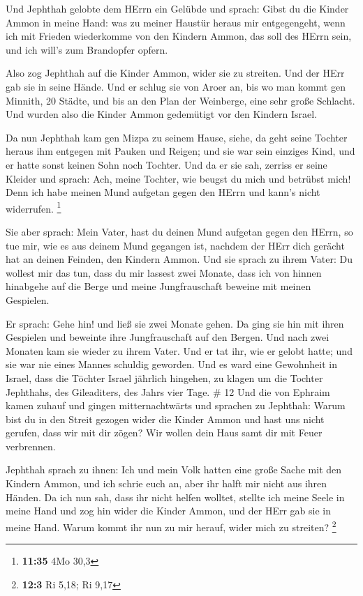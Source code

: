  Und Jephthah gelobte dem HErrn ein Gelübde und sprach:
Gibst du die Kinder Ammon in meine Hand:  was zu meiner
Haustür heraus mir entgegengeht, wenn ich mit Frieden wiederkomme von
den Kindern Ammon, das soll des HErrn sein, und ich will's zum
Brandopfer opfern.

 Also zog Jephthah auf die Kinder Ammon, wider sie zu
streiten. Und der HErr gab sie in seine Hände.  Und er
schlug sie von Aroer an, bis wo man kommt gen Minnith, 20 Städte, und
bis an den Plan der Weinberge, eine sehr große Schlacht. Und wurden also
die Kinder Ammon gedemütigt vor den Kindern Israel.

 Da nun Jephthah kam gen Mizpa zu seinem Hause, siehe, da
geht seine Tochter heraus ihm entgegen mit Pauken und Reigen; und sie
war sein einziges Kind, und er hatte sonst keinen Sohn noch Tochter.
 Und da er sie sah, zerriss er seine Kleider und sprach:
Ach, meine Tochter, wie beugst du mich und betrübst mich! Denn ich habe
meinen Mund aufgetan gegen den HErrn und kann's nicht widerrufen.
\footnote{\textbf{11:35} 4Mo 30,3}

 Sie aber sprach: Mein Vater, hast du deinen Mund aufgetan
gegen den HErrn, so tue mir, wie es aus deinem Mund gegangen ist,
nachdem der HErr dich gerächt hat an deinen Feinden, den Kindern Ammon.
 Und sie sprach zu ihrem Vater: Du wollest mir das tun,
dass du mir lassest zwei Monate, dass ich von hinnen hinabgehe auf die
Berge und meine Jungfrauschaft beweine mit meinen Gespielen.

 Er sprach: Gehe hin! und ließ sie zwei Monate gehen. Da
ging sie hin mit ihren Gespielen und beweinte ihre Jungfrauschaft auf
den Bergen.  Und nach zwei Monaten kam sie wieder zu ihrem
Vater. Und er tat ihr, wie er gelobt hatte; und sie war nie eines Mannes
schuldig geworden. Und es ward eine Gewohnheit in Israel, 
dass die Töchter Israel jährlich hingehen, zu klagen um die Tochter
Jephthahs, des Gileaditers, des Jahrs vier Tage. \# 12  Und
die von Ephraim kamen zuhauf und gingen mitternachtwärts und sprachen zu
Jephthah: Warum bist du in den Streit gezogen wider die Kinder Ammon und
hast uns nicht gerufen, dass wir mit dir zögen? Wir wollen dein Haus
samt dir mit Feuer verbrennen.

 Jephthah sprach zu ihnen: Ich und mein Volk hatten eine
große Sache mit den Kindern Ammon, und ich schrie euch an, aber ihr
halft mir nicht aus ihren Händen.  Da ich nun sah, dass ihr
nicht helfen wolltet, stellte ich meine Seele in meine Hand und zog hin
wider die Kinder Ammon, und der HErr gab sie in meine Hand. Warum kommt
ihr nun zu mir herauf, wider mich zu streiten? \footnote{\textbf{12:3}
  Ri 5,18; Ri 9,17}

